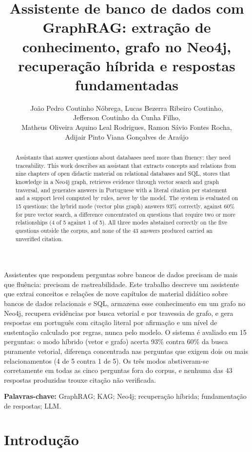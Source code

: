 \documentclass[12pt]{article}
\title{Assistente de banco de dados com GraphRAG: extração de
conhecimento, grafo no Neo4j, recuperação híbrida e
respostas fundamentadas}
\author{João Pedro Coutinho Nóbrega\inst{1}, Lucas Bezerra Ribeiro Coutinho\inst{1},\\
  Jefferson Coutinho da Cunha Filho\inst{1},\\
  Matheus Oliveira Aquino Leal Rodrigues\inst{1}, Ramon Sávio Fontes Rocha\inst{1},\\
  Adijair Pinto Viana Gonçalves de Araújo\inst{1}}
\begin{document}
\maketitle

\begin{abstract}
Assistants that answer questions about databases need more than fluency: they need traceability.
This work describes an assistant that extracts concepts and relations from nine chapters of open
didactic material on relational databases and SQL, stores that knowledge in a Neo4j graph,
retrieves evidence through vector search and graph traversal, and generates answers in Portuguese
with a literal citation per statement and a support level computed by rules, never by the model.
The system is evaluated on 15 questions: the hybrid mode (vector plus graph) answers 93\% correctly,
against 60\% for pure vector search, a difference concentrated on questions that require two or more
relationships (4 of 5 against 1 of 5). All three modes abstained correctly on the five questions
outside the corpus, and none of the 43 answers produced carried an unverified citation.
\end{abstract}

\begin{resumo}
Assistentes que respondem perguntas sobre bancos de dados precisam de mais que fluência: precisam
de rastreabilidade. Este trabalho descreve um assistente que extrai conceitos e relações de nove
capítulos de material didático sobre bancos de dados relacionais e SQL, armazena esse conhecimento
em um grafo no Neo4j, recupera evidências por busca vetorial e por travessia de grafo, e gera
respostas em português com citação literal por afirmação e um nível de sustentação calculado por
regras, nunca pelo modelo. O sistema é avaliado em 15 perguntas: o modo híbrido (vetor e grafo)
acerta 93\% contra 60\% da busca puramente vetorial, diferença concentrada nas perguntas que exigem
dois ou mais relacionamentos (4 de 5 contra 1 de 5). Os três modos abstiveram-se corretamente em
todas as cinco perguntas fora do corpus, e nenhuma das 43 respostas produzidas trouxe citação não
verificada.

\vspace{4pt}
\noindent \textbf{Palavras-chave:} GraphRAG; KAG; Neo4j; recuperação híbrida; fundamentação de
respostas; LLM.
\end{resumo}

\section{Introdução}
\end{document}
